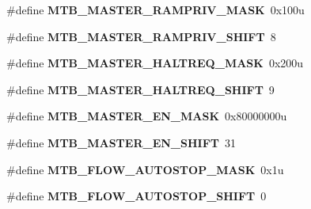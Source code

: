 \begin{DoxyCompactItemize}
\item 
\mbox{\label{group___m_t_b___register___masks_ga93d1c4a852b65c4f91c847930414e3bf}} 
\#define {\bfseries M\+T\+B\+\_\+\+M\+A\+S\+T\+E\+R\+\_\+\+R\+A\+M\+P\+R\+I\+V\+\_\+\+M\+A\+SK}~0x100u
\item 
\mbox{\label{group___m_t_b___register___masks_gadd17751eced675ec41c38640f7922cc3}} 
\#define {\bfseries M\+T\+B\+\_\+\+M\+A\+S\+T\+E\+R\+\_\+\+R\+A\+M\+P\+R\+I\+V\+\_\+\+S\+H\+I\+FT}~8
\item 
\mbox{\label{group___m_t_b___register___masks_gaee5817b3564e9ce65cc9c26af3055978}} 
\#define {\bfseries M\+T\+B\+\_\+\+M\+A\+S\+T\+E\+R\+\_\+\+H\+A\+L\+T\+R\+E\+Q\+\_\+\+M\+A\+SK}~0x200u
\item 
\mbox{\label{group___m_t_b___register___masks_ga5f262014ec318bcd2273ade4e32ab362}} 
\#define {\bfseries M\+T\+B\+\_\+\+M\+A\+S\+T\+E\+R\+\_\+\+H\+A\+L\+T\+R\+E\+Q\+\_\+\+S\+H\+I\+FT}~9
\item 
\mbox{\label{group___m_t_b___register___masks_gab9f73fe136cde10e51b5192c621aaf7d}} 
\#define {\bfseries M\+T\+B\+\_\+\+M\+A\+S\+T\+E\+R\+\_\+\+E\+N\+\_\+\+M\+A\+SK}~0x80000000u
\item 
\mbox{\label{group___m_t_b___register___masks_ga48c3714ccdd23d6fae7221619e7a3b29}} 
\#define {\bfseries M\+T\+B\+\_\+\+M\+A\+S\+T\+E\+R\+\_\+\+E\+N\+\_\+\+S\+H\+I\+FT}~31
\item 
\mbox{\label{group___m_t_b___register___masks_ga9a44f1be981682cb9519f33e95b94644}} 
\#define {\bfseries M\+T\+B\+\_\+\+F\+L\+O\+W\+\_\+\+A\+U\+T\+O\+S\+T\+O\+P\+\_\+\+M\+A\+SK}~0x1u
\item 
\mbox{\label{group___m_t_b___register___masks_gacd0f126527ae40477d013b771e5103ee}} 
\#define {\bfseries M\+T\+B\+\_\+\+F\+L\+O\+W\+\_\+\+A\+U\+T\+O\+S\+T\+O\+P\+\_\+\+S\+H\+I\+FT}~0
\item 
\mbox{\label{group___m_t_b___register___masks_ga6be5a7f0961e0862f4d2d270f0524a51}} 

\end{DoxyCompactItemize}
